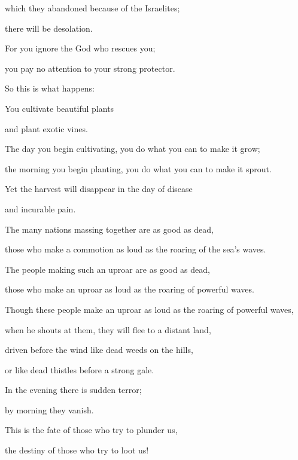 {\par }{\Q which
they abandoned
because of the Israelites;
\par }{\Q there will be
desolation.
\par }{\Q {}For
you ignore
the God
who rescues
you;
\par }{\Q you pay
no
attention
to
your strong
protector.
\par }{\Q So this is
what happens:
\par }{\Q You cultivate
beautiful
plants
\par }{\Q and plant
exotic
vines.
\par }{\Q {}The day
you begin cultivating,
you do what you can to make
it grow;
\par }{\Q the morning
you begin planting,
you do what you can to make it sprout.
\par }{\Q Yet the harvest
will disappear
in the day
of disease
\par }{\Q and incurable
pain.
\par }{\Q {}The many
nations
massing together
are as good as dead,
\par }{\Q those who make a commotion
as loud as the roaring
of the sea’s waves.
\par }{\Q The people
making such an uproar
are as good as dead,

\par }{\Q those who make an uproar as loud as
the roaring
of powerful
waves.
\par }{\Q {}Though these people
make an uproar as loud as
the roaring
of powerful
waves,
\par }{\Q when he shouts at
them, they will flee
to a distant land,
\par }{\Q driven
before
the wind
like dead weeds
on the hills,
\par }{\Q or like dead thistles
before
a strong gale.
\par }{\Q {}In the evening
there is
sudden terror;
\par }{\Q by morning
they vanish.
\par }{\Q This
is the fate of those who try to plunder us,
\par }{\Q the destiny
of those who try
to loot us!

\par }
